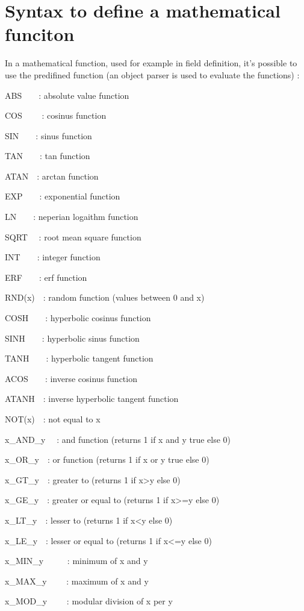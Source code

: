 \section{Syntax to define a mathematical funciton}
\label{parser}
In a mathematical function,
used for example in field definition, it's possible to use the predifined function (an object parser is used to
evaluate the functions) :

ABS\ \ \ \ : absolute value function

COS \ \ \ \ : cosinus function

SIN\ \ \ \ : sinus function

TAN\ \ \ \ : tan function

ATAN\ \ : arctan function

EXP\ \ \ \ : exponential function

LN\ \ \ \ : neperian logaithm function

SQRT \ \ : root mean square function

INT\ \ \ \ : integer function

ERF\ \ \ \ : erf function

RND(x)\ \ : random function (values between 0 and x)

COSH\ \ \ \ : hyperbolic cosinus function

SINH\ \ \ \ : hyperbolic sinus function

TANH\ \ \ \ : hyperbolic tangent function

ACOS\ \ \ \ : inverse cosinus function

ATANH\ \ : inverse hyperbolic tangent function

NOT(x)\ \ : not equal to x 

x\_AND\_y \ \ : and function (returns 1 if x and y true else 0)

x\_OR\_y\ \ : or function (returns 1 if x or y true else 0)

x\_GT\_y\ \ : greater to (returns 1 if x{\textgreater}y else 0)

x\_GE\_y\ \ : greater or equal to (returns 1 if x{\textgreater}=y else 0)

x\_LT\_y\ \ : lesser to (returns 1 if x{\textless}y else 0)

x\_LE\_y\ \ : lesser or equal to (returns 1 if x{\textless}=y else 0)

x\_MIN\_y \ \ \ \ \ : minimum of x and y

x\_MAX\_y \ \ \ \ : maximum of x and y

x\_MOD\_y \ \ \ \ : modular division of x per y

